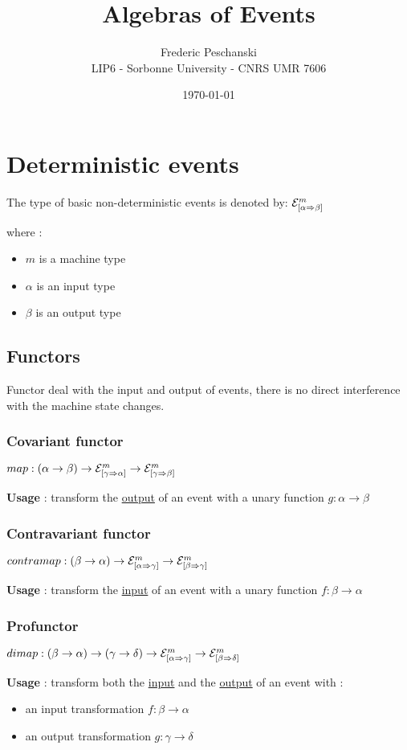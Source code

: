 \documentclass{article}
\title{Algebras of Events}
\author{Frederic Peschanski\\LIP6 - Sorbonne University - CNRS UMR 7606}
\date{\today}
\newcommand{\EV}[3]{\ensuremath{{\cal{E}}^{#1}_{[#2 \Rightarrow #3]}}}
\begin{document}
\maketitle

\section{Deterministic events}

The type of basic non-deterministic events is denoted by: $\EV{m}{\alpha}{\beta}$

where :

\begin{itemize}
\item $m$ is a machine type
\item $\alpha$ is an input type
\item $\beta$ is an output type
\end{itemize}

\subsection{Functors}

Functor deal with the input and output of events, there is no direct interference with the machine state
 changes.

\subsubsection*{Covariant functor}

$map: (\alpha \rightarrow \beta) \rightarrow  \EV{m}{\gamma}{\alpha} \rightarrow \EV{m}{\gamma}{\beta}$

\textbf{Usage} : transform the \underline{output} of an event with a unary function $g : \alpha \rightarrow \beta$

\subsubsection*{Contravariant functor}

$contramap: (\beta \rightarrow \alpha) \rightarrow  \EV{m}{\alpha}{\gamma} \rightarrow \EV{m}{\beta}{\gamma}$

\textbf{Usage} : transform the \underline{input} of an event with a unary function $f : \beta \rightarrow \alpha$

\subsubsection*{Profunctor}

$dimap: (\beta \rightarrow \alpha) \rightarrow (\gamma \rightarrow \delta) \rightarrow  \EV{m}{\alpha}{\gamma} \rightarrow \EV{m}{\beta}{\delta}$

\textbf{Usage} : transform both the \underline{input} and the \underline{output} of an event with :
\begin{itemize}
\item an input transformation $f : \beta \rightarrow \alpha$
\item an output transformation $g : \gamma \rightarrow \delta$
\end{itemize}
\end{document}
